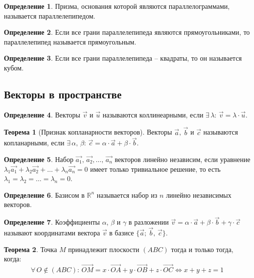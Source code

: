 \documentclass[12pt]{article}
\theoremstyle{definition}
\newtheorem{theorem}{Теорема}[section]
\newtheorem{definition}{Определение}
\newcommand{\R}{\mathbb{R}}
\begin{document}
    \begin{definition}
        Призма, основания которой являются параллелограммами, называется параллелепипедом.
    \end{definition}
    \begin{definition}
        Если все грани параллелепипеда являются прямоугольниками, то параллелепипед называется прямоугольным.
    \end{definition}
    \begin{definition}
        Если все грани параллелепипеда – квадраты, то он называется кубом.
    \end{definition}
    
    
    \subsection{Векторы в пространстве}
    
    \begin{definition}
        Векторы $\vec{v}$ и $\vec{u}$ называются коллинеарными, если $\exists\,\lambda:\,\vec{v}=\lambda\cdot\vec{u}$.
    \end{definition}
    \begin{theorem}[Признак копланарности векторов]
        Векторы $\vec{a}$, $\vec{b}$ и $\vec{c}$ называются копланарными, если $\exists\,\alpha,\,\beta:\,\vec{c}=\alpha\cdot\vec{a}+\beta\cdot\vec{b}$.
    \end{theorem}
    \begin{definition}
        Набор $\vec{a_1},\,\vec{a_2},\ldots,\,\vec{a_n}$ векторов линейно независим, если уравнение $\lambda_1\vec{a_1}+\lambda_2\vec{a_2}+\ldots+\lambda_n\vec{a_n}=0$ имеет только тривиальное решение, то есть $\lambda_1=\lambda_2=\ldots=\lambda_n=0$.
    \end{definition}
    \begin{definition}
        Базисом в $\R^n$ называется набор из $n$ линейно независимых векторов.
    \end{definition}
    \begin{definition}
        Коэффициенты $\alpha$, $\beta$ и $\gamma$ в разложении $\vec{v}=\alpha\cdot\vec{a}+\beta\cdot\vec{b}+\gamma\cdot\vec{c}$ называют координатами вектора $\vec{v}$ в базисе $\{\vec{a};\,\vec{b},\,\vec{c}\}$.
    \end{definition}
    \begin{theorem}
        Точка $M$ принадлежит плоскости $(ABC)$ тогда и только тогда, когда:
        $$\forall\,O\notin(ABC):\,\overrightarrow{OM}=x\cdot\overrightarrow{OA}+y\cdot\overrightarrow{OB}+z\cdot\overrightarrow{OC}\Longleftrightarrow x+y+z=1$$
    \end{theorem}
    
\end{document}
